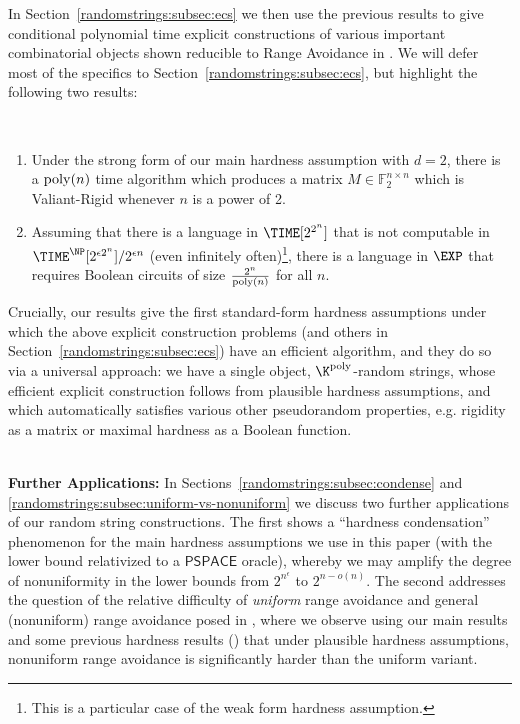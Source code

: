 In Section~\ref{randomstrings:subsec:ecs} we then use the previous results to give conditional polynomial time explicit constructions of various important combinatorial objects shown reducible to Range Avoidance in \cite{Korten21}. We will defer most of the specifics to Section~\ref{randomstrings:subsec:ecs}, but highlight the following two results:
\begin{theorem*}
~
\begin{enumerate}
    \item Under the strong form of our main hardness assumption with $d=2$, there is a $\mathrm{poly}(n)$ time algorithm which produces a matrix $M \in \mathbb{F}_2^{n \times n}$ which is Valiant-Rigid whenever $n$ is a power of 2.
    \item Assuming that there is a language in $\TIME[2^{2^n}]$ that is not computable in $\TIME^\NP[2^{\epsilon 2^n}]/2^{\epsilon n}$ (even infinitely often)\footnote{This is a particular case of the weak form hardness assumption.}, there is a language in $\EXP$ that requires Boolean circuits of size $\frac{2^n}{\mathrm{poly}(n)}$ for all $n$.
\end{enumerate}
\end{theorem*}

Crucially, our results give the first standard-form hardness assumptions under which the above explicit construction problems (and others in Section~\ref{randomstrings:subsec:ecs}) have an efficient algorithm, and they do so via a universal approach: we have a single object, $\K^{\poly}$-random strings, whose efficient explicit construction follows from plausible hardness assumptions, and which automatically satisfies various other pseudorandom properties, e.g. rigidity as a matrix or maximal hardness as a Boolean function. 

~\\
{\bf \noindent Further Applications:} In Sections~\ref{randomstrings:subsec:condense} and \ref{randomstrings:subsec:uniform-vs-nonuniform} we discuss two further applications of our random string constructions. The first shows a ``hardness condensation'' phenomenon for the main hardness assumptions we use in this paper (with the lower bound relativized to a $\mathsf{PSPACE}$ oracle), whereby we may amplify the degree of nonuniformity in the lower bounds from $2^{n^{\epsilon}}$ to $2^{n - o(n)}$.
The second addresses the question of the relative difficulty of \emph{uniform} range avoidance and general (nonuniform) range avoidance posed in \cite{RSW22,ILW23}, where we observe using our main results and some previous hardness results (\cite{ILW23,ABK24}) that under plausible hardness assumptions, nonuniform range avoidance is significantly harder than the uniform variant. 


